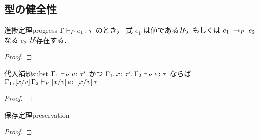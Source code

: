 \subsection{型の健全性}
\label{sec:type:soundness}

\begin{theorem}{進捗定理}{progress}
  $\TyJudge{P}{\Gamma}{e_1}{\tau}$ のとき，
  式 $e_1$ は値であるか，もしくは $\Reduce{P}{e_1}{e_2}$ なる $e_2$ が存在する．
\end{theorem}
\begin{proof}
\end{proof}

\begin{lemma}{代入補題}{subst}
  $\TyJudge{P}{\Gamma_1}{v}{\tau'}$ かつ
  $\TyJudge{P}{\Gamma_1, \typed{x}{\tau'}, \Gamma_2}{e}{\tau}$ ならば
  $\TyJudge{P}{\Gamma_1, \subst{x}{v}{\Gamma_2}}{\subst{x}{v}{e}}{\subst{x}{v}{\tau}}$
\end{lemma}
\begin{proof}
\end{proof}

\begin{theorem}{保存定理}{preservation}
\end{theorem}
\begin{proof}
\end{proof}
